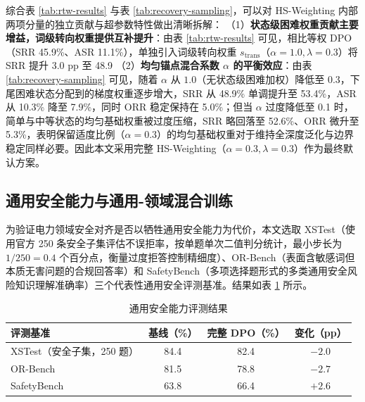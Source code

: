\documentclass[fontset=fandol,type=master,campus=shenzhen,etitleauto=true]{hithesisbook}
\begin{document}
综合表 \ref{tab:rtw-results} 与表 \ref{tab:recovery-sampling}，可以对 HS-Weighting 内部两项分量的独立贡献与超参数特性做出清晰拆解：
（1）\textbf{状态级困难权重贡献主要增益，词级转向权重提供互补提升}：由表 \ref{tab:rtw-results} 可见，相比等权 DPO（SRR 45.9\%、ASR 11.1\%），单独引入词级转向权重 $s_{\text{trans}}$（$\alpha=1.0, \lambda=0.3$）将 SRR 提升 3.0 pp 至 48.9%
（2）\textbf{均匀锚点混合系数 $\alpha$ 的平衡效应}：由表 \ref{tab:recovery-sampling} 可见，随着 $\alpha$ 从 $1.0$（无状态级困难加权）降低至 $0.3$，下尾困难状态分配到的梯度权重逐步增大，SRR 从 48.9\% 单调提升至 53.4\%，ASR 从 10.3\% 降至 7.9\%，同时 ORR 稳定保持在 5.0\%；但当 $\alpha$ 过度降低至 0.1 时，简单与中等状态的均匀基础权重被过度压缩，SRR 略回落至 52.6\%、ORR 微升至 5.3\%，表明保留适度比例（$\alpha=0.3$）的均匀基础权重对于维持全深度泛化与边界稳定同样必要。因此本文采用完整 HS-Weighting（$\alpha=0.3, \lambda=0.3$）作为最终默认方案。

\subsection{通用安全能力与通用-领域混合训练}\label{general-safety-mixing}

为验证电力领域安全对齐是否以牺牲通用安全能力为代价，本文选取 XSTest（使用官方 250 条安全子集评估不误拒率，按单题单次二值判分统计，最小步长为 $1/250 = 0.4$ 个百分点，衡量过度拒答控制精细度）、OR-Bench（表面含敏感词但本质无害问题的合规回答率）和 SafetyBench（多项选择题形式的多类通用安全风险知识理解准确率）三个代表性通用安全评测基准。结果如表 \ref{tab:general-safety} 所示。

\begin{table}[htbp]
\centering
\caption{通用安全能力评测结果}
\label{tab:general-safety}
\small
\renewcommand{\arraystretch}{1.15}
\begin{tabular}{l c c c}
\toprule
\textbf{评测基准} & \textbf{基线（\%）} & \textbf{完整 DPO（\%）} & \textbf{变化（pp）} \\
\midrule
XSTest（安全子集，250 题） & 84.4 & 82.4 & $-2.0$ \\
OR-Bench & 81.5 & 78.8 & $-2.7$ \\
SafetyBench & 63.8 & 66.4 & $+2.6$ \\
\bottomrule
\end{tabular}
\end{table}
\end{document}
